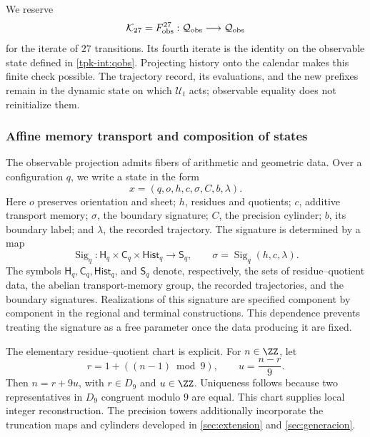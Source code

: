 We reserve
\[
 \mathcal K_{27}=F_{\rm obs}^{27}:
 \mathcal Q_{\rm obs}\longrightarrow\mathcal Q_{\rm obs}
\]
for the iterate of \(27\) transitions. Its fourth iterate is the
identity on the observable state defined in \eqref{tpk-int:qobs}.
Projecting history onto the calendar makes this finite check possible.
The trajectory record, its evaluations, and the new prefixes remain in
the dynamic state on which \(\mathcal U_t\) acts; observable equality
does not reinitialize them.

\subsubsection{Affine memory transport and composition of states}
\label{tpk-int:memoria}

The observable projection admits fibers of arithmetic and geometric data.
Over a configuration \(q\), we write a state in the form
\[
 x=(q,o,h,c,\sigma,C,b,\lambda).
\]
Here \(o\) preserves orientation and sheet; \(h\), residues and
quotients; \(c\), additive transport memory; \(\sigma\), the boundary
signature; \(C\), the precision cylinder; \(b\), its boundary label;
and \(\lambda\), the recorded trajectory. The signature is determined
by a map
\[
 \operatorname{Sig}_q:
 \mathsf H_q\times\mathsf C_q\times\mathsf{Hist}_q
 \longrightarrow\mathsf S_q,
 \qquad \sigma=\operatorname{Sig}_q(h,c,\lambda).
\]
The symbols \(\mathsf H_q,\mathsf C_q,\mathsf{Hist}_q\), and
\(\mathsf S_q\) denote, respectively, the sets of residue--quotient
data, the abelian transport-memory group, the recorded trajectories,
and the boundary signatures. Realizations of this signature are specified
component by component in the regional and terminal constructions.
This dependence prevents treating the signature as a free parameter
once the data producing it are fixed.

The elementary residue--quotient chart is explicit. For
\(n\in\ZZ\), let
\[
 r=1+((n-1)\bmod9),\qquad u=\frac{n-r}{9}.
\]
Then \(n=r+9u\), with \(r\in D_9\) and \(u\in\ZZ\).
Uniqueness follows because two representatives in \(D_9\) congruent
modulo \(9\) are equal. This chart supplies local integer reconstruction.
The precision towers additionally incorporate the truncation maps and
cylinders developed in \ref{sec:extension} and \ref{sec:generacion}.

